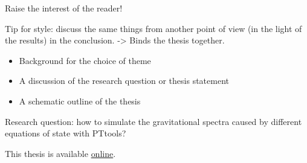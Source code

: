 Raise the interest of the reader!

Tip for style: discuss the same things from another point of view (in the light of the results) in the conclusion.
-> Binds the thesis together.

\begin{itemize}
    \item Background for the choice of theme
    \item A discussion of the research question or thesis statement
    \item A schematic outline of the thesis
\end{itemize}

Research question: how to simulate the gravitational spectra caused by different equations of state with PTtools?

This thesis is available \href{https://gitlab.com/AgenttiX/msc-thesis2}{online}.
